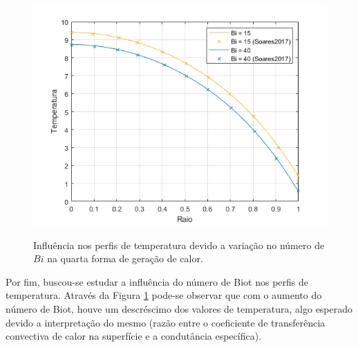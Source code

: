 \begin{figure}[H]
    \centering
    \caption{Influência nos perfis de temperatura devido a variação no número de \(Bi\) na quarta forma de geração de calor.}
    \includegraphics[scale=0.7]{figures/results/Fig15.png}
    \label{fig:influence_of_Biot_on_fourth_heat_generation}
\end{figure}

Por fim, buscou-se estudar a influência do número de Biot nos perfis de temperatura. Através da Figura \ref{fig:influence_of_Biot_on_fourth_heat_generation} pode-se observar que com o aumento do número de Biot, houve um descréscimo dos valores de temperatura, algo esperado devido a interpretação do mesmo (razão entre o coeficiente de transferência convectiva de calor na superfície e a condutância específica).
